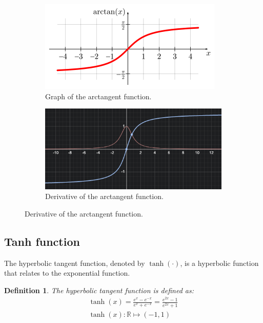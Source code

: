 \documentclass[11pt]{book} %
\newtheorem{definition}{Definition}[section]
\begin{document}
\begin{figure}[h]
    \begin{subfigure}{0.5\textwidth}
        \centering
        \includegraphics[width=\linewidth]{Figs/arctan.png}
        \caption{Graph of the arctangent function.}
        \label{fig:arctangent}
    \end{subfigure}
    \begin{subfigure}{0.5\textwidth}
        \centering
        \includegraphics[width=\linewidth]{Figs/arctan_der.png}
        \caption{Derivative of the arctangent function.}
        \label{fig:arctangent_derivative}
    \end{subfigure}
\end{figure}

\subsection{Tanh function}
The hyperbolic tangent function, denoted by \(\tanh(\cdot)\), is a hyperbolic function that relates to the exponential function.
\begin{definition}
    The hyperbolic tangent function is defined as:
    \begin{align*}
        \tanh(x) = \frac{e^x - e^{-x}}{e^x + e^{-x}} = \frac{e^{2x} - 1}{e^{2x} + 1} \\
        \tanh(x) : \mathbb{R} \mapsto (-1, 1)
    \end{align*}
\end{definition}
\end{document}
